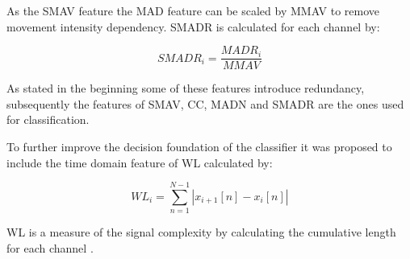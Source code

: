 As the SMAV feature the MAD feature can be scaled by MMAV to remove movement intensity dependency. SMADR is calculated for each channel by:

\begin{equation} \label{eq:MMADR}
SMADR_i=\frac{MADR_i}{MMAV}
\end{equation}


As stated in the beginning some of these features introduce redundancy, subsequently the features of SMAV, CC, MADN and SMADR are the ones used for classification. \cite{Donovan2017}

To further improve the decision foundation of the classifier it was proposed to include the time domain feature of WL calculated by: 

\begin{equation} \label{eq:WL}
WL_i=\sum_{n=1}^{N-1}|x_{i+1}[n]-x_i[n]|
\end{equation}

WL is a measure of the signal complexity by calculating the cumulative length for each channel \cite{Phiny2012}.









